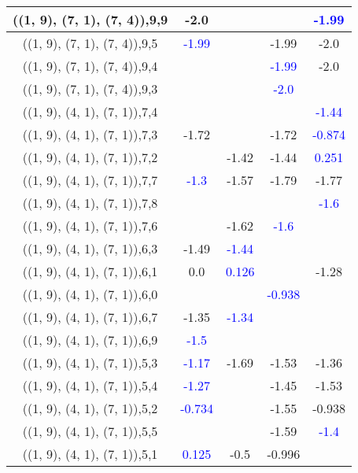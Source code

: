 \documentclass{article}
\begin{document}
\begin{center}
\begin{longtable}{|c|c|c|c|c|}
        	\hline
        	((1, 9), (7, 1), (7, 4)),9,9&-2.0&&& \textcolor{blue}{-1.99}\\
        	\hline
        	((1, 9), (7, 1), (7, 4)),9,5& \textcolor{blue}{-1.99}&&-1.99&-2.0\\
        	\hline
        	((1, 9), (7, 1), (7, 4)),9,4&&& \textcolor{blue}{-1.99}&-2.0\\
        	\hline
        	((1, 9), (7, 1), (7, 4)),9,3&&& \textcolor{blue}{-2.0}&\\
        	\hline
        	((1, 9), (4, 1), (7, 1)),7,4&&&& \textcolor{blue}{-1.44}\\
        	\hline
        	((1, 9), (4, 1), (7, 1)),7,3&-1.72&&-1.72& \textcolor{blue}{-0.874}\\
        	\hline
        	((1, 9), (4, 1), (7, 1)),7,2&&-1.42&-1.44& \textcolor{blue}{0.251}\\
        	\hline
        	((1, 9), (4, 1), (7, 1)),7,7& \textcolor{blue}{-1.3}&-1.57&-1.79&-1.77\\
        	\hline
        	((1, 9), (4, 1), (7, 1)),7,8&&&& \textcolor{blue}{-1.6}\\
        	\hline
        	((1, 9), (4, 1), (7, 1)),7,6&&-1.62& \textcolor{blue}{-1.6}&\\
        	\hline
        	((1, 9), (4, 1), (7, 1)),6,3&-1.49& \textcolor{blue}{-1.44}&&\\
        	\hline
        	((1, 9), (4, 1), (7, 1)),6,1&0.0& \textcolor{blue}{0.126}&&-1.28\\
        	\hline
        	((1, 9), (4, 1), (7, 1)),6,0&&& \textcolor{blue}{-0.938}&\\
        	\hline
        	((1, 9), (4, 1), (7, 1)),6,7&-1.35& \textcolor{blue}{-1.34}&&\\
        	\hline
        	((1, 9), (4, 1), (7, 1)),6,9& \textcolor{blue}{-1.5}&&&\\
        	\hline
        	((1, 9), (4, 1), (7, 1)),5,3& \textcolor{blue}{-1.17}&-1.69&-1.53&-1.36\\
        	\hline
        	((1, 9), (4, 1), (7, 1)),5,4& \textcolor{blue}{-1.27}&&-1.45&-1.53\\
        	\hline
        	((1, 9), (4, 1), (7, 1)),5,2& \textcolor{blue}{-0.734}&&-1.55&-0.938\\
        	\hline
        	((1, 9), (4, 1), (7, 1)),5,5&&&-1.59& \textcolor{blue}{-1.4}\\
        	\hline
        	((1, 9), (4, 1), (7, 1)),5,1& \textcolor{blue}{0.125}&-0.5&-0.996&\\

\end{longtable}
\end{center}
\end{document}
